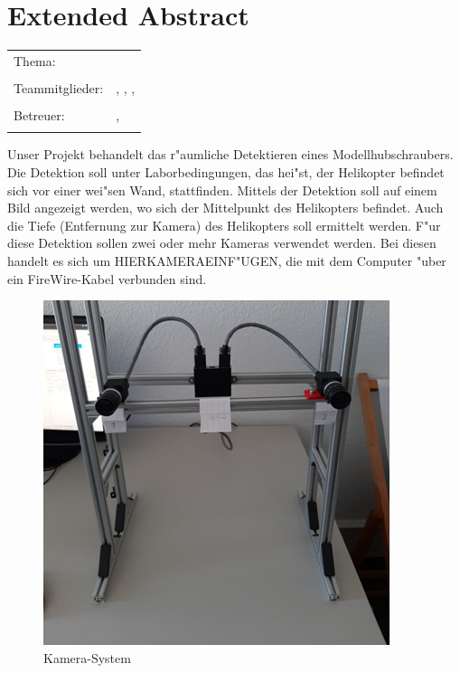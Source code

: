 \chapter*{Extended Abstract}

\begin{center}
	\begingroup
	\renewcommand*{\arraystretch}{1}
	{\makeatletter	
		\begin{tabular}{p{3.2cm}p{9.6cm}}
			Thema: & \thema \\
			& \\
			Teammitglieder: & \verfasserA, \verfasserB, 
			\verfasserC, \verfasserD\\
			& \\
			Betreuer: & \hoschschule \newline \institut \newline \prueferA, \prueferB \\
			& \\
		\end{tabular}
		
		\makeatother}
	\endgroup
\end{center}

\bigskip

\noindent
Unser Projekt behandelt das r"aumliche Detektieren eines Modellhubschraubers. Die Detektion soll unter Laborbedingungen, das hei"st, der Helikopter befindet sich vor einer wei"sen Wand, stattfinden. Mittels der Detektion soll auf einem Bild angezeigt werden, wo sich der Mittelpunkt des Helikopters befindet. Auch die Tiefe (Entfernung zur Kamera) des Helikopters soll ermittelt werden. F"ur diese Detektion sollen zwei oder mehr Kameras verwendet werden. Bei diesen handelt es sich um HIERKAMERAEINF"UGEN, die mit dem Computer "uber ein FireWire-Kabel verbunden sind.\newline

\begin{figure}[H]
	\includegraphics[scale=1.0]{bilder/camerasystem}
	\caption[Kamera-System]{Kamera-System}
\end{figure}

